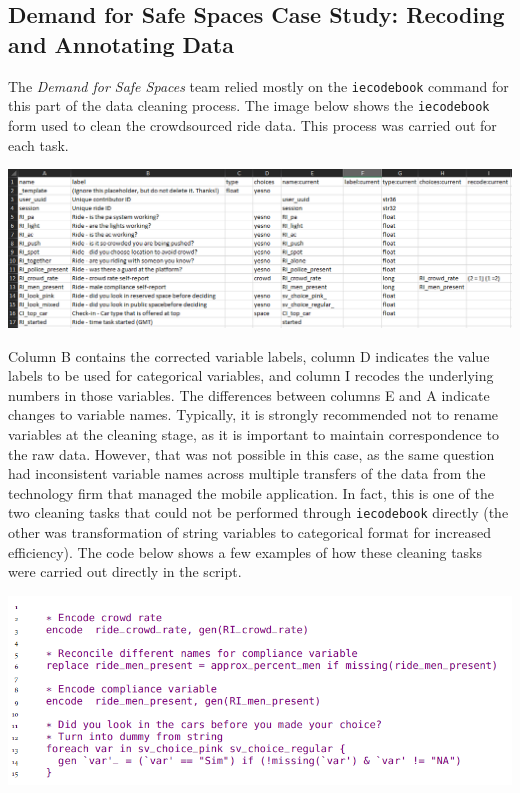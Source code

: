 \documentclass[
]{book}
\begin{document}
\begin{ex}
\hypertarget{demand-for-safe-spaces-case-study-recoding-and-annotating-data}{%
\subsection{Demand for Safe Spaces Case Study: Recoding and Annotating Data}\label{demand-for-safe-spaces-case-study-recoding-and-annotating-data}}

The \emph{Demand for Safe Spaces} team relied mostly on the \texttt{iecodebook} command for this part of the data cleaning process. The image below shows the \texttt{iecodebook} form used to clean the crowdsourced ride data. This process was carried out for each task.

\includegraphics{examples/iecodebook.png}

Column B contains the corrected variable labels, column D indicates the value labels to be used for categorical variables, and column I recodes the underlying numbers in those variables. The differences between columns E and A indicate changes to variable names. Typically, it is strongly recommended not to rename variables at the cleaning stage, as it is important to maintain correspondence to the raw data. However, that was not possible in this case, as the same question had inconsistent variable names across multiple transfers of the data from the technology firm that managed the mobile application. In fact, this is one of the two cleaning tasks that could not be performed through \texttt{iecodebook} directly (the other was transformation of string variables to categorical format for increased efficiency). The code below shows a few examples of how these cleaning tasks were carried out directly in the script.

\includegraphics{examples/ch5-recording-and-annotating-data.png}


\end{ex}
\end{document}
